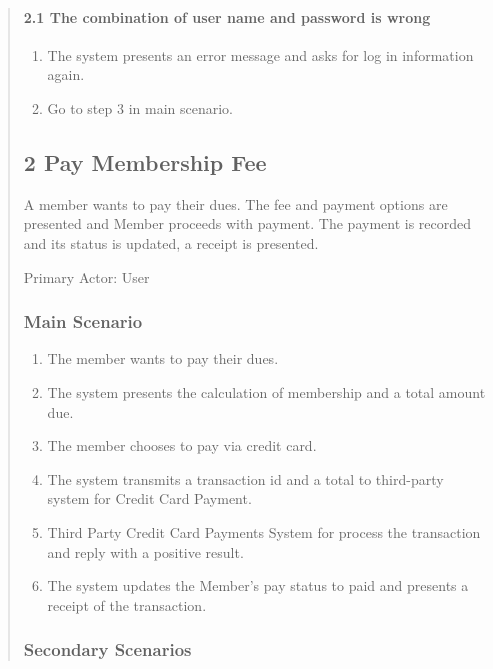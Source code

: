 \begin{quote}
\paragraph{2.1 The combination of user name and password is
wrong}\label{the-combination-of-user-name-and-password-is-wrong}

\begin{enumerate}
\tightlist
\item
  The system presents an error message and asks for log in information
  again.
\item
  Go to step 3 in main scenario.
\end{enumerate}

\subsection{2 Pay Membership Fee}\label{pay-membership-fee}

A member wants to pay their dues. The fee and payment options are
presented and Member proceeds with payment. The payment is recorded and
its status is updated, a receipt is presented.

Primary Actor: User

\subsubsection{Main Scenario}\label{main-scenario-1}

\begin{enumerate}
\tightlist
\item
  The member wants to pay their dues.
\item
  The system presents the calculation of membership and a total amount
  due.
\item
  The member chooses to pay via credit card.
\item
  The system transmits a transaction id and a total to third-party
  system for Credit Card Payment.
\item
  Third Party Credit Card Payments System for process the transaction
  and reply with a positive result.
\item
  The system updates the Member's pay status to paid and presents a
  receipt of the transaction.
\end{enumerate}

\subsubsection{Secondary Scenarios}\label{secondary-scenarios-1}


\end{quote}
